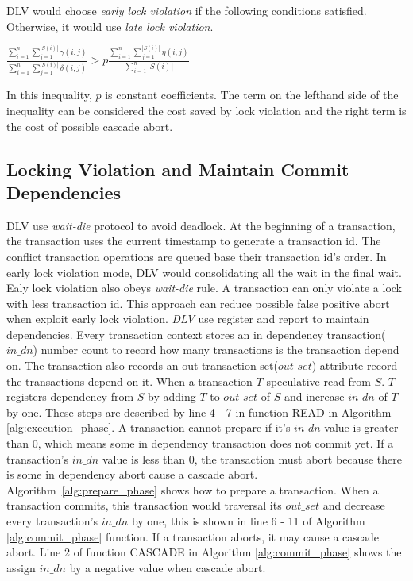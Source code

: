 \documentclass[conference]{IEEEtran}
\begin{document}
DLV would choose \emph{early lock violation} if the following conditions  satisfied.
Otherwise, it would use \emph{late lock violation}.
\begin{center}
  ${
    {\frac
      {\sum_{i = 1}^{n} \sum_{j = 1}^{|S(i)|} \gamma(i, j)}
      {\sum_{i = 1}^{n} \sum_{j = 1}^{|S(i)|} \delta(i, j)} 
    }
    >
    p{\frac
      {\sum_{i = 1}^{n} \sum_{j = 1}^{|S(i)|}  \eta(i, j)}
      {\sum_{i = 1}^{n} {|S(i)|}} 
    }
  }$
\label{ine:condition}
\end{center}

In this inequality,  ${p}$ is constant coefficients.
The term on the lefthand side of the inequality can be considered the cost saved by lock violation and the right term is the cost of possible cascade abort. 

\subsection {Locking Violation and Maintain Commit Dependencies}
DLV use \emph{wait-die} protocol to avoid deadlock.
At the beginning of a transaction, the transaction uses the current timestamp to generate a transaction id.
The conflict transaction operations are queued base their transaction id's order.
In early lock violation mode, 
DLV would consolidating all the wait in the final wait.
Ealy lock violation also obeys \emph{wait-die} rule.
A transaction can only violate a lock with less transaction id.
This approach can reduce  possible false positive abort when exploit early lock violation.
\emph{DLV} use register and report\cite{HeckatonMVCC:journals/pvldb/LarsonBDFPZ11} to maintain dependencies.
Every transaction context stores an in dependency transaction(${in\_dn}$) number count to record how many transactions is the transaction depend on.
The transaction also records an out transaction set(${out\_set}$) attribute record the transactions depend on it.
When a transaction ${T}$ speculative read from ${S}$.
${T}$ registers dependency from ${S}$ by adding ${T}$ to ${out\_set}$ of ${S}$ and increase ${in\_dn}$ of ${T}$ by one.
These steps are described by line 4 - 7 in function READ in Algorithm \ref{alg:execution_phase}.
A transaction cannot prepare if it's ${in\_dn}$ value is greater than 0, which means some in dependency transaction does not commit yet.
If a transaction's ${in\_dn}$ value is less than 0, the transaction must abort because there is some in dependency abort cause a cascade abort.
Algorithm~\ref{alg:prepare_phase} shows how to prepare a transaction.
When a transaction commits, this transaction would traversal its ${out\_set}$ and decrease every transaction's ${in\_dn}$ by one, this is shown in line 6 - 11 of Algorithm \ref{alg:commit_phase} function.
If a transaction aborts, it may cause a cascade abort.
Line 2 of function CASCADE in Algorithm \ref{alg:commit_phase} shows the assign ${in\_dn}$ by a negative value when cascade abort.
\end{document}
